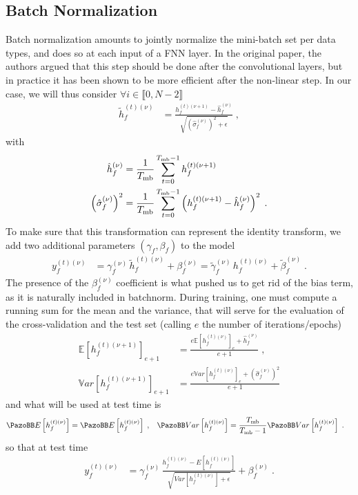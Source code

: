 \subsection{Batch Normalization}

Batch normalization\cite{Ioffe2015} amounts to jointly normalize the mini-batch set per data types, and does so at each input of a FNN layer. In the original paper, the authors argued that this step should be done after the convolutional layers, but in practice it has been shown to be more efficient after the non-linear step. In our case, we will thus consider $\forall i \in \llbracket 0,N-2\rrbracket$
\begin{align}
\tilde{h}_{f}^{(t)(\nu)}&=\frac{h_{f}^{(t)(\nu+1)}-\hat{h}_{f}^{(\nu)}}
%
{\sqrt{\left(\hat{\sigma}_{f}^{(\nu)}\right)^2+\epsilon}}\;,
\end{align}
with
\begin{align}
\hat{h}_{f}^{(\nu)}&=
%
\frac{1}{T_{{\rm mb}}}\sum^{T_{{\rm mb}}-1}_{t=0}h_{f}^{(t)(\nu+1)}\\
%
\left(\hat{\sigma}_{f}^{(\nu)}\right)^2&=\frac{1}{T_{{\rm mb}}}\sum^{T_{{\rm mb}}-1}_{t=0}
%
\left(h_{f}^{(t)(\nu+1)}-\hat{h}_{f}^{(\nu)}\right)^2\;.
\end{align} To make sure that this transformation can represent the identity transform, we add two additional parameters $(\gamma_f,\beta_f)$ to the model
\begin{align}
y^{(t)(\nu)}_{f}&=\gamma^{(\nu)}_f\,\tilde{h}_{f}^{(t)(\nu)}+\beta^{(\nu)}_f
%
=\tilde{\gamma}^{(\nu)}_f\,h_{f}^{(t)(\nu)}+\tilde{\beta}^{(\nu)}_f\;.
\end{align}
The presence of the $\beta^{(\nu)}_f$ coefficient is what pushed us to get rid of the bias term, as it is naturally included in batchnorm. During training, one must compute a running sum for the mean and the variance, that will serve for the evaluation of the cross-validation and the test set (calling $e$ the number of iterations/epochs)
\begin{align}
\mathbb{E}\left[h_{f}^{(t)(\nu+1)}\right]_{e+1} &=
%
\frac{e\mathbb{E}\left[h_{f}^{(t)(\nu)}\right]_{e}+\hat{h}_{f}^{(\nu)}}{e+1}\;,\\
%
\mathbb{V}ar\left[h_{f}^{(t)(\nu+1)}\right]_{e+1} &=
%
\frac{e\mathbb{V}ar\left[h_{f}^{(t)(\nu)}\right]_{e}+\left(\hat{\sigma}_{f}^{(\nu)}\right)^2}{e+1}
\end{align}
and what will be used at test time is
\begin{align}
\mathbb{E}\left[h_{f}^{(t)(\nu)}\right]&=\mathbb{E}\left[h_{f}^{(t)(\nu)}\right]\;,&
%
\mathbb{V}ar\left[h_{f}^{(t)(\nu)}\right]&=
%
\frac{T_{{\rm mb}}}{T_{{\rm mb}}-1}\mathbb{V}ar\left[h_{f}^{(t)(\nu)}\right]\;.
\end{align}
so that at test time
\begin{align}
y^{(t)(\nu)}_{f}&=\gamma^{(\nu)}_f\,\frac{h_{f}^{(t)(\nu)}-E[h_{f}^{(t)(\nu)}]}{\sqrt{Var\left[h_{f}^{(t)(\nu)}\right]+\epsilon}}+\beta^{(\nu)}_f\;.
\end{align}

